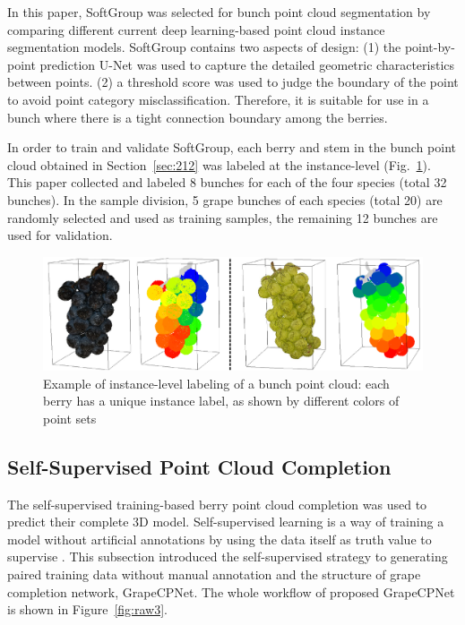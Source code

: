\documentclass[12pt]{article}
\begin{document}
In this paper, SoftGroup \citep{vu_softgroup_2022} was selected for bunch point cloud segmentation by comparing different current deep learning-based point cloud instance segmentation models. 
SoftGroup contains two aspects of design: 
(1) the point-by-point prediction U-Net was used to capture the detailed geometric characteristics between points. 
(2) a threshold score was used to judge the boundary of the point to avoid point category misclassification. 
Therefore, it is suitable for use in a bunch where there is a tight connection boundary among the berries.

In order to train and validate SoftGroup, each berry and stem in the bunch point cloud obtained in Section~\ref{sec:212} was labeled at the instance-level (Fig.~\ref{fig:raw11}). 
This paper collected and labeled 8 bunches for each of the four species (total 32 bunches). 
In the sample division, 5 grape bunches of each species (total 20) are randomly selected and used as training samples, the remaining 12 bunches are used for validation.

\begin{figure}[hbt!]
    \centering
    \includegraphics[width=1\textwidth]{figures/Figure6.pdf}
    \caption{Example of instance-level labeling of a bunch point cloud: each berry has a unique instance label, as shown by different colors of point sets}
    \label{fig:raw11}
\end{figure}

\subsection{Self-Supervised Point Cloud Completion}

The self-supervised training-based berry point cloud completion was used to predict their complete 3D model. 
Self-supervised learning is a way of training a model without artificial annotations by using the data itself as truth value to supervise \citep{fei_selfsupervised_2023}. 
This subsection introduced the self-supervised strategy to generating paired training data without manual annotation and the structure of grape completion network, GrapeCPNet. 
The whole workflow of proposed GrapeCPNet is shown in Figure~\ref{fig:raw3}.
\end{document}
